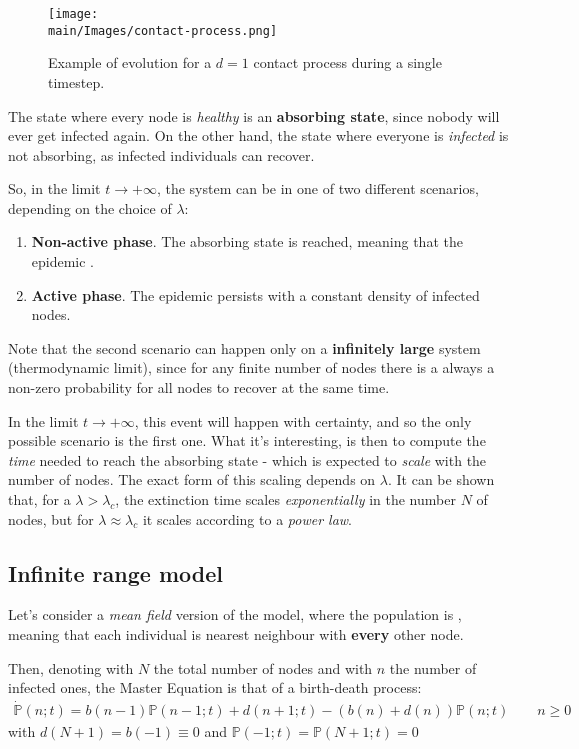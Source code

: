 \documentclass[../../main.tex]{subfiles}
\begin{document}
\begin{figure}[H]
    \centering
    \texttt{[image: \\main/Images/contact-process.png]}
    \caption{Example of evolution for a $d=1$ contact process during a single timestep.}
    \label{fig:contact-process}
\end{figure}
The state where every node is \textit{healthy} is an \textbf{absorbing state}, since nobody will ever get infected again. On the other hand, the state where everyone is \textit{infected} is not absorbing, as infected individuals can recover.

\medskip

So, in the limit $t \to +\infty$, the system can be in one of two different scenarios, depending on the choice of $\lambda$:
\begin{enumerate}
    \item \textbf{Non-active phase}. The absorbing state is reached, meaning that the epidemic .
    \item \textbf{Active phase}. The epidemic persists with a constant density of infected nodes.
\end{enumerate}

Note that the second scenario can happen only on a \textbf{infinitely large} system (thermodynamic limit), since for any finite number of nodes there is a always a non-zero probability for all nodes to recover at the same time.

In the limit $t \to +\infty$, this event will happen with certainty, and so the only possible scenario is the first one. What it's interesting, is then to compute the \textit{time} needed to reach the absorbing state - which is expected to \textit{scale} with the number of nodes. The exact form of this scaling depends on $\lambda$. It can be shown that, for a $\lambda > \lambda_c$, the extinction time scales \textit{exponentially} in the number $N$ of nodes, but for $\lambda \approx \lambda_c$ it scales according to a \textit{power law}.

\subsection{Infinite range model}
Let's consider a \textit{mean field} version of the model, where the population is , meaning that each individual is nearest neighbour with \textbf{every} other node. 

\medskip

Then, denoting with $N$ the total number of nodes and with $n$ the number of infected ones, the Master Equation is that of a birth-death process:
\begin{align}\label{eqn:contact-ME}
    \dot{\mathbb{P}}(n;t) = b(n-1) \mathbb{P}(n-1;t) + d(n+1;t) - (b(n) + d(n)) \mathbb{P}(n;t) \qquad n \geq 0
\end{align}
with $d(N+1) = b(-1) \equiv 0$ and  $\mathbb{P}(-1;t) = \mathbb{P}(N+1;t) = 0$
\end{document}
